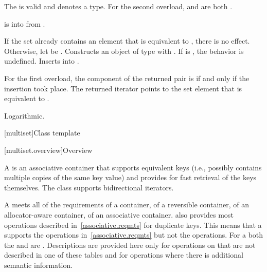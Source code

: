 \begin{itemdescr}
\pnum
\constraints
The  
is valid and denotes a type.
For the second overload,
 and
 are both .

\pnum
\expects
{} is  into  from
.

\pnum
\effects
If the set already contains an element that is equivalent to ,
there is no effect.
Otherwise, let  be .
Constructs an object  of type 
with .
If  is , the behavior is undefined.
Inserts  into .

\pnum
\returns
For the first overload,
the  component of the returned pair is 
if and only if the insertion took place.
The returned iterator points to the set element that is equivalent to .

\pnum
\complexity
Logarithmic.
\end{itemdescr}

[multiset]{Class template }

[multiset.overview]{Overview}

\pnum
{}%
A
is an associative container that supports equivalent keys (i.e., possibly contains multiple copies of
the same key value) and provides for fast retrieval of the keys themselves.
The
 class
supports bidirectional iterators.

\pnum
A  meets all of the requirements
of a container,
of a reversible container,
of an allocator-aware container,
of an associative container.
also provides most operations described in~\ref{associative.reqmts}
for duplicate keys.
This means that a
supports the
operations in~\ref{associative.reqmts}
but not the
operations.
For a
both the
and
are
.
Descriptions are provided here only for operations on
that are not described in one of these tables
and for operations where there is additional semantic information.

